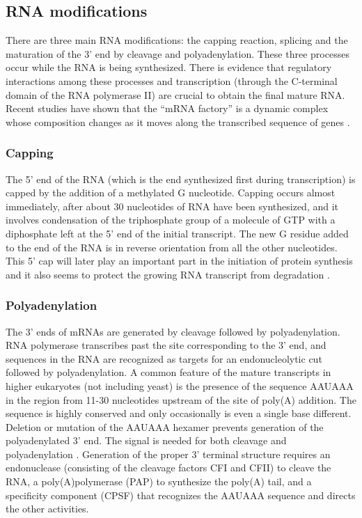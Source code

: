 \subsection*{RNA modifications}

There are three main RNA modifications: the capping reaction, splicing
and the maturation of the 3' end by cleavage and polyadenylation.
These three processes occur while the RNA is being synthesized. There
is evidence that regulatory interactions among these processes and
transcription (through the C-terminal domain of the RNA polymerase II)
are crucial to obtain the final mature RNA. Recent studies have
shown that the ``mRNA factory'' is a dynamic complex whose
composition changes as it moves along the transcribed sequence of genes
\citep{zorio:2004a}. 

\subsubsection{Capping}

The 5' end of the RNA (which is the end synthesized first during
transcription) is capped by the addition of a methylated G
nucleotide. Capping occurs almost immediately, after about 30
nucleotides of RNA have been synthesized, and it involves condensation
of the triphosphate group of a molecule of GTP with a diphosphate left
at the 5' end of the initial transcript. The new G residue added to
the end of the RNA is in reverse orientation from all the other
nucleotides. This 5' cap will later play an important part in the
initiation of protein synthesis and it also seems to protect the
growing RNA transcript from degradation \citep{lewis:1997a}.

\subsubsection{Polyadenylation}

The 3' ends of mRNAs are generated by cleavage followed by
polyadenylation. RNA polymerase transcribes past the site
corresponding to the 3' end, and sequences in the RNA are recognized
as targets for an endonucleolytic cut followed by polyadenylation. A
common feature of the mature transcripts in higher eukaryotes (not
including yeast) is the presence of the sequence AAUAAA in the region
from 11-30 nucleotides upstream of the site of poly(A) addition. The
sequence is highly conserved and only occasionally is even a single
base different. Deletion or mutation of the AAUAAA hexamer prevents
generation of the polyadenylated 3' end. The signal is needed for both
cleavage and polyadenylation \citep{lewis:1997a}. Generation of the
proper 3' terminal structure requires an endonuclease (consisting of
the cleavage factors CFI and CFII) to cleave the RNA, a poly(A)polymerase
(PAP) to synthesize the poly(A) tail, and a specificity component
(CPSF) that recognizes the AAUAAA sequence and directs the other
activities.

